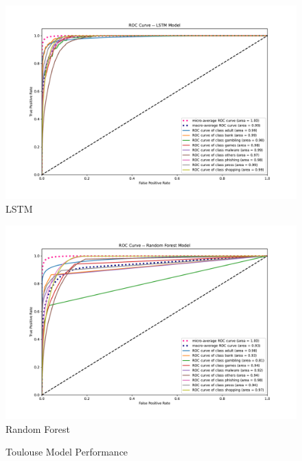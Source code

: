 \documentclass[12pt, letterpaper]{article}
\begin{document}
\begin{figure}[!htb]
\centering
\caption{Toulouse Model Performance}\label{toulouse_lstm_rf_svm}
	\begin{minipage}[b]{0.3\textwidth}
	\centering
	\label{toulouse_lstm}
	\includegraphics[width=\textwidth]{figs/roc-toulouse-2017-lstm.pdf}\\LSTM
	\end{minipage}
	\begin{minipage}[b]{0.3\textwidth}
	\centering
	\label{toulouse_rf}
	\includegraphics[width=\textwidth]{figs/roc-toulouse-2017-rf.pdf}\\Random Forest
	\end{minipage}
	\begin{minipage}[b]{0.3\textwidth}
	\centering
	\label{toulouse_rf}

\end{minipage}
\end{figure}
\end{document}
